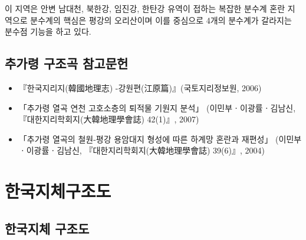 \documentclass[12pt,a4paper]{book}
\newcommand{\SectionMargin}			{\newpage  \null \vskip 0cm}
\begin{document}
			이 지역은 안변 남대천, 북한강, 임진강, 한탄강 유역이 접하는 복잡한 분수계 혼란 지역으로 
			분수계의 핵심은 평강의 오리산이며 이를 중심으로 4개의 분수계가 갈라지는 분수점 기능을 하고 있다.



	\SectionMargin
	\section{추가령 구조곡 참고문헌}
	
		\begin{itemize}[itemsep=0.0em]
		\item	『한국지리지(韓國地理志) -강원편(江原篇)』(국토지리정보원, 2006)

		\item	「추가령 열곡 연천 고호소층의 퇴적물 기원지 분석」
				(이민부ㆍ이광률ㆍ김남신, 『대한지리학회지(大韓地理學會誌) 42(1)』, 2007)

		\item	「추가령 열곡의 철원-평강 용암대지 형성에 따른 하계망 혼란과 재편성」
				(이민부ㆍ이광률ㆍ김남신, 『대한지리학회지(大韓地理學會誌) 39(6)』, 2004)
		\end{itemize}






%
%
%
\newpage
\chapter{한국지체구조도}




	\SectionMargin
	\section{한국지체 구조도}
\end{document}
